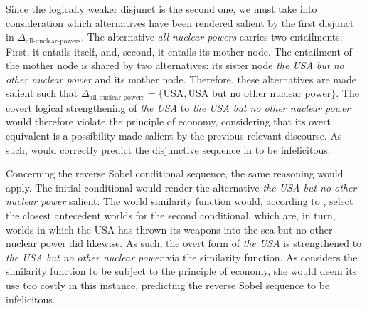 Since the logically weaker disjunct is the second one, we must take into consideration which alternatives have been rendered salient by the first disjunct in $\Delta_\text{all-nuclear-powers}$. The alternative \textit{all nuclear powers} carries two entailments: First, it entails itself, and, second, it entails its mother node. The entailment of the mother node is shared by two alternatives: its sister node \textit{the USA but no other nuclear power} and its mother node. Therefore, these alternatives are made salient such that $\Delta_\text{all-nuclear-powers}=\{\text{USA},\text{USA but no other nuclear power}\}$. The covert logical strengthening of \textit{the USA} to \textit{the USA but no other nuclear power} would therefore violate the principle of economy, considering that its overt equivalent is a possibility made salient by the previous relevant discourse. As such, \textcite{Ippolito2020} would correctly predict the disjunctive sequence in  to be infelicitous.

Concerning the reverse Sobel conditional sequence, the same reasoning would apply. The initial conditional would render the alternative \textit{the USA but no other nuclear power} salient. The world similarity function would, according to \textcite{Ippolito2020}, select the closest antecedent worlds for the second conditional, which are, in turn, worlds in which the USA has thrown its weapons into the sea but no other nuclear power did likewise. As such, the overt form of \textit{the USA} is strengthened to \textit{the USA but no other nuclear power} via the similarity function. As \textcite{Ippolito2020} considers the similarity function to be subject to the principle of economy, she would deem its use too costly in this instance, predicting the reverse Sobel sequence to be infelicitous.

